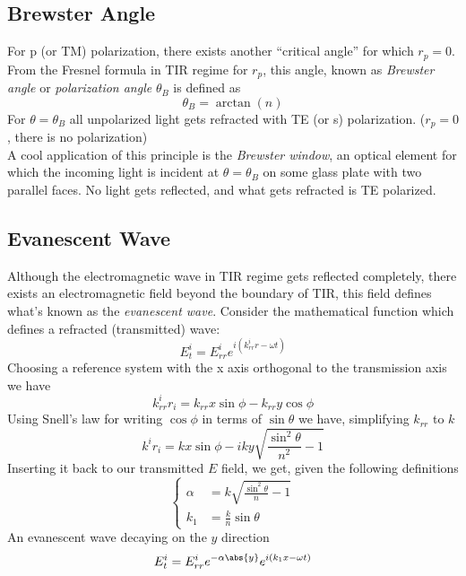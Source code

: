 \documentclass[../electromagnetism.tex]{subfiles}
\begin{document}
\subsection{Brewster Angle}
For p (or TM) polarization, there exists another ``critical angle'' for which $r_p=0$. From the Fresnel formula in TIR regime for $r_p$, this angle, known as \textit{Brewster angle} or \textit{polarization angle} $\theta_B$ is defined as
\begin{equation}
	\theta_B=\arctan(n)
	\label{eq:brewsterangle}
\end{equation}
For $\theta=\theta_B$ all unpolarized light gets refracted with TE (or s) polarization. ($r_p=0$, there is no polarization)\\
A cool application of this principle is the \emph{Brewster window}, an optical element for which the incoming light is incident at $\theta=\theta_B$ on some glass plate with two parallel faces. No light gets reflected, and what gets refracted is TE polarized.
\subsection{Evanescent Wave}
Although the electromagnetic wave in TIR regime gets reflected completely, there exists an electromagnetic field beyond the boundary of TIR, this field defines what's known as the \emph{evanescent wave}. Consider the mathematical function which defines a refracted (transmitted) wave:
\begin{equation*}
	E_t^i=E_{rr}^ie^{i(k_{rr}^ir-\omega t)}
\end{equation*}
Choosing a reference system with the x axis orthogonal to the transmission axis we have
\begin{equation*}
	k^i_{rr}r_i=k_{rr}x\sin\phi-k_{rr}y\cos\phi
\end{equation*}
Using Snell's law for writing $\cos\phi$ in terms of $\sin\theta$ we have, simplifying $k_{rr}$ to $k$
\begin{equation}
	k^ir_i=kx\sin\phi-iky\sqrt{\frac{\sin^2\theta}{n^2}-1}
	\label{eq:tirewavincrefsys}
\end{equation}
Inserting it back to our transmitted $E$ field, we get, given the following definitions
\begin{equation*}
	\left\{ \begin{aligned}
			\alpha&= k\sqrt{\frac{\sin^2\theta}{n}-1}\\
			k_1&= \frac{k}{n}\sin\theta
	\end{aligned}\right.
\end{equation*}
An evanescent wave decaying on the $y$ direction
\begin{equation}
	E_t^i=E^i_{rr}e^{-\alpha\abs{y}}e^{i(k_1x-\omega t)}
	\label{eq:evanescentwave}
\end{equation}
\end{document}
